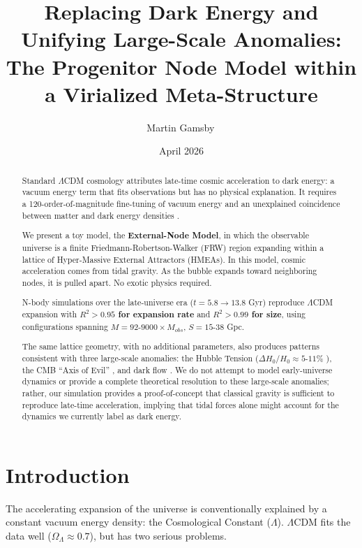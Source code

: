 \documentclass{article}
\title{Replacing Dark Energy and Unifying Large-Scale Anomalies: \\ The Progenitor Node Model within a Virialized Meta-Structure}
\author{Martin Gamsby\,\orcidlink{0009-0007-4069-9687}}
\date{April 2026}
\begin{document}
\maketitle

\begin{abstract}
Standard $\Lambda$CDM cosmology \cite{Planck2020} attributes late-time cosmic acceleration to dark energy: a vacuum energy term that fits observations but has no physical explanation.
It requires a 120-order-of-magnitude fine-tuning of vacuum energy \cite{Weinberg1989} and an unexplained coincidence between matter and dark energy densities \cite{Steinhardt1999}.

We present a toy model, the \textbf{External-Node Model}, in which the observable universe is a finite Friedmann-Robertson-Walker (FRW) region expanding within a lattice of Hyper-Massive External Attractors (HMEAs).
In this model, cosmic acceleration comes from tidal gravity. As the bubble expands toward neighboring nodes, it is pulled apart. No exotic physics required.

N-body simulations over the late-universe era ($t=5.8 \rightarrow 13.8$ Gyr) reproduce $\Lambda$CDM expansion with \textbf{$R^2 > 0.95$ for expansion rate} and \textbf{$R^2 > 0.99$ for size}, using configurations spanning $M = 92$-$9000 \times M_{obs}$, $S = 15$-$38$ Gpc.

The same lattice geometry, with no additional parameters, also produces patterns consistent with three large-scale anomalies: the Hubble Tension ($\Delta H_0/H_0 \approx 5$-$11\%$ \cite{Riess2022}), the CMB ``Axis of Evil'' \cite{Land2005}, and dark flow \cite{Watkins2023}. We do not attempt to model early-universe dynamics or provide a complete theoretical resolution to these large-scale anomalies; rather, our simulation provides a proof-of-concept that classical gravity is sufficient to reproduce late-time acceleration, implying that tidal forces alone might account for the dynamics we currently label as dark energy.
\end{abstract}

\section{Introduction}
\label{sec:intro}

The accelerating expansion of the universe \cite{Riess1998, Perlmutter1999} is conventionally explained by a constant vacuum energy density: the Cosmological Constant ($\Lambda$).
$\Lambda$CDM fits the data well ($\Omega_\Lambda \approx 0.7$), but has two serious problems.
\end{document}
